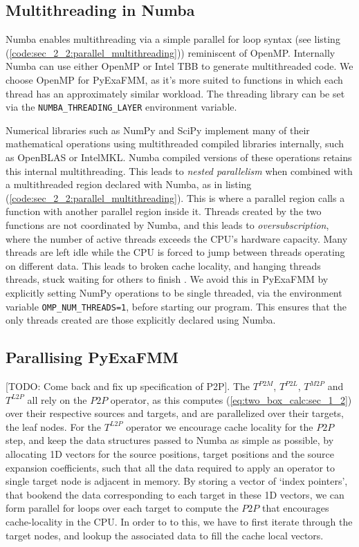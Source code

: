 \subsection*{Multithreading in Numba}

Numba enables multithreading via a simple parallel for loop syntax (see listing (\ref{code:sec_2_2:parallel_multithreading})) reminiscent of OpenMP. Internally Numba can use either OpenMP or Intel TBB to generate multithreaded code. We choose OpenMP for PyExaFMM, as it's more suited to functions in which each thread has an approximately similar workload. The threading library can be set via the \lstinline{NUMBA_THREADING_LAYER} environment variable.

Numerical libraries such as NumPy and SciPy implement many of their mathematical operations using multithreaded compiled libraries internally, such as OpenBLAS or IntelMKL. Numba compiled versions of these operations retains this internal multithreading. This leads to \textit{nested parallelism} when combined with a multithreaded region declared with Numba, as in listing (\ref{code:sec_2_2:parallel_multithreading}). This is where a parallel region calls a function with another parallel region inside it. Threads created by the two functions are not coordinated by Numba, and this leads to \textit{oversubscription}, where the number of active threads exceeds the CPU's hardware capacity. Many threads are left idle while the CPU is forced to jump between threads operating on different data. This leads to broken cache locality, and hanging threads threads, stuck waiting for others to finish \cite{malakhov2016python}. We avoid this in PyExaFMM by explicitly setting NumPy operations to be single threaded, via the environment variable \lstinline{OMP_NUM_THREADS=1}, before starting our program. This ensures that the only threads created are those explicitly declared using Numba.


\subsection*{Parallising PyExaFMM}

[TODO: Come back and fix up specification of P2P].
The $T^{P2M}$, $T^{P2L}$, $T^{M2P}$ and $T^{L2P}$ all rely on the $P2P$ operator, as this computes (\ref{eq:two_box_calc:sec_1_2}) over their respective sources and targets, and are parallelized over their targets, the leaf nodes. For the $T^{L2P}$ operator we encourage cache locality for the $P2P$ step, and keep the data structures passed to Numba as simple as possible, by allocating 1D vectors for the source positions, target positions and the source expansion coefficients, such that all the data required to apply an operator to single target node is adjacent in memory. By storing a vector of `index pointers', that bookend the data corresponding to each target in these 1D vectors, we can form parallel for loops over each target to compute the $P2P$ that encourages cache-locality in the CPU. In order to to this, we have to first iterate through the target nodes, and lookup the associated data to fill the cache local vectors.

